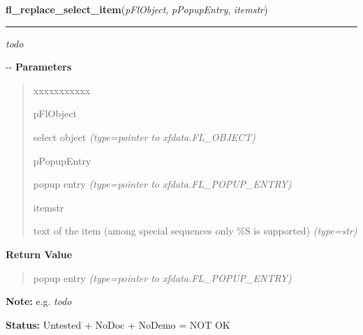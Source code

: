     \vspace{0.5ex}

\hspace{.8\funcindent}\begin{boxedminipage}{\funcwidth}

    \raggedright \textbf{fl\_replace\_select\_item}(\textit{pFlObject}, \textit{pPopupEntry}, \textit{itemstr})

    \vspace{-1.5ex}

    \rule{\textwidth}{0.5\fboxrule}
\setlength{\parskip}{2ex}

\emph{todo}

-{}-
\setlength{\parskip}{1ex}
      \textbf{Parameters}
      \vspace{-1ex}

      \begin{quote}
        \begin{Ventry}{xxxxxxxxxxx}

          \item[pFlObject]


select object
            {\it (type=pointer to xfdata.FL\_OBJECT)}

          \item[pPopupEntry]


popup entry
            {\it (type=pointer to xfdata.FL\_POPUP\_ENTRY)}

          \item[itemstr]


text of the item (among special sequences only \%S is supported)
            {\it (type=str)}

        \end{Ventry}

      \end{quote}

      \textbf{Return Value}
    \vspace{-1ex}

      \begin{quote}

popup entry
      {\it (type=pointer to xfdata.FL\_POPUP\_ENTRY)}

      \end{quote}

\textbf{Note:} 
e.g. \emph{todo}


\textbf{Status:} 
Untested + NoDoc + NoDemo = NOT OK


    \end{boxedminipage}

